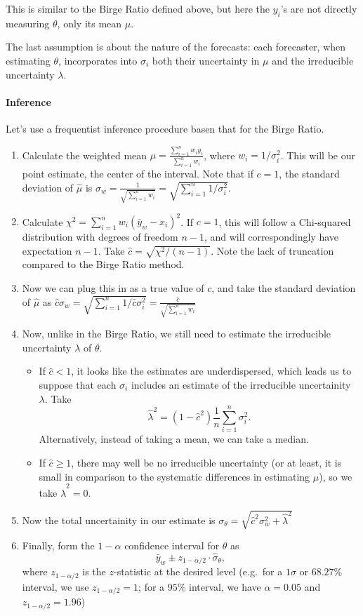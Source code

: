 \documentclass[12pt]{article}
\begin{document}
This is similar to the Birge Ratio defined above, but here the $y_i$'s are not directly measuring $\theta$, only its mean $\mu$.

The last assumption is about the nature of the forecasts: each forecaster, when estimating $\theta$, incorporates into $\sigma_i$ both their uncertainty in $\mu$ and the irreducible uncertainty $\lambda$.

\paragraph{Inference}\label{inference-7}

Let's use a frequentist inference procedure basen that for the Birge Ratio.

\begin{enumerate}
\item
  Calculate the weighted mean $\hat\mu=\frac{\sum_{i=1}^n w_iy_i}{\sum_{i=1}^nw_i}$, where $w_i=1/\sigma_i^2$. This will be our point estimate, the center of the interval. Note that if $c=1$, the standard deviation of $\hat\mu$ is $\sigma_w=\frac{1}{\sqrt{\sum_{i=1}^nw_i}}=\sqrt{\sum_{i=1}^n1/\sigma_i^2}$.
\item
  Calculate $\chi^2=\sum_{i=1}^n w_i(\bar{y}_w-x_i)^2$. If $c=1$, this will follow a Chi-squared distribution with degrees of freedom $n-1$, and will correspondingly have expectation $n-1$. Take $\hat c=\sqrt{\chi^2/(n-1)}$. Note the lack of truncation compared to the Birge Ratio method.
\item
  Now we can plug this in as a true value of $c$, and take the standard deviation of $\hat\mu$ as $\hat c\sigma_w=\sqrt{\sum_{i=1}^n1/\hat c\sigma_i^2}=\frac{\hat c}{\sqrt{\sum_{i=1}^nw_i}}$
\item
  Now, unlike in the Birge Ratio, we still need to estimate the irreducible uncertainty $\lambda$ of $\theta$.

  \begin{itemize}
  
  \item
    If $\hat c < 1$, it looks like the estimates are underdispersed, which leads us to suppose that each $\sigma_i$ includes an estimate of the irreducible uncertainity $\lambda$. Take \[\hat \lambda^2=(1-\hat c^2)\frac{1}{n}\sum_{i=1}^n \sigma_i^2.\] Alternatively, instead of taking a mean, we can take a median.
  \item
    If $\hat c \geq 1$, there may well be no irreducible uncertainty (or at least, it is small in comparison to the systematic differences in estimating $\mu$), so we take $\hat\lambda^2=0$.
  \end{itemize}
\item
  Now the total uncertainity in our estimate is $\sigma_\theta=\sqrt{\hat c^2\sigma_w^2 + \hat\lambda^2}$
\item
  Finally, form the $1-\alpha$ confidence interval for $\theta$ as \[\bar{y}_w\pm z_{1-{\alpha/2}}\cdot \hat \sigma_\theta,\] where $z_{1-\alpha/2}$ is the $z$-statistic at the desired level (e.g.~for a $1\sigma$ or $68.27\%$ interval, we use $z_{1-\alpha/2}=1$; for a $95\%$ interval, we have $\alpha=0.05$ and $z_{1-\alpha/2}=1.96$)
\end{enumerate}
\end{document}
